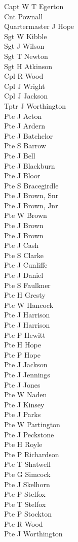 \begin{multicols}{2}
  \noindent
  Capt W T Egerton \\
  Cnt Pownall \\
  Quartermaster J Hope \\
  Sgt W Kibble \\
  Sgt J Wilson \\
  Sgt T Newton \\
  Sgt H Atkinson \\
  Cpl R Wood \\
  Cpl J Wright \\
  Cpl J Jackson \\
  Tptr J Worthington \\
  Pte J Acton \\
  Pte J Ardern \\
  Pte J Batchelor \\
  Pte S Barrow \\
  Pte J Bell \\
  Pte J Blackburn \\
  Pte J Bloor \\
  Pte S Bracegirdle \\
  Pte J Brown, Snr \\
  Pte J Brown, Jnr \\
  Pte W Brown \\
  Pte J Brown \\
  Pte J Brown \\
  Pte J Cash \\
  Pte S Clarke \\
  Pte J Cunliffe \\
  Pte J Daniel \\
  Pte S Faulkner \\
  Pte H Gresty \\
  Pte W Hancock \\
  Pte J Harrison \\
  Pte J Harrison \\
  Pte P Hewitt \\
  Pte H Hope \\
  Pte P Hope \\
  Pte J Jackson \\
  Pte J Jennings \\
  Pte J Jones \\
  Pte W Naden \\
  Pte J Kinsey \\
  Pte J Parks \\
  Pte W Partington \\
  Pte J Peckstone \\
  Pte H Royle \\
  Pte P Richardson \\
  Pte T Shatwell \\
  Pte G Simcock \\
  Pte J Skelhorn \\
  Pte P Stelfox \\
  Pte T Stelfox \\
  Pte P Stockton \\
  Pte R Wood \\
  Pte J Worthington \\
\end{multicols}

